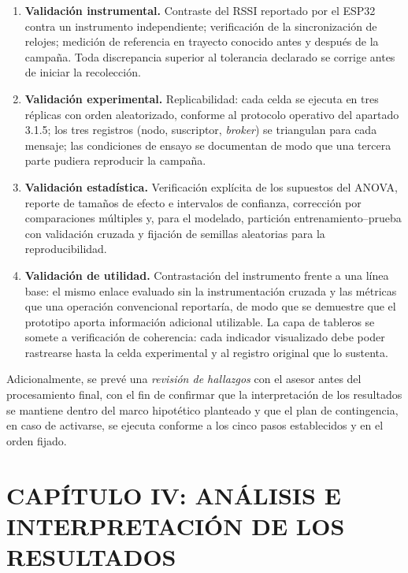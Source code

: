 \documentclass[
  12pt,
]{article}
\providecommand{\tightlist}{%
  \setlength{\itemsep}{0pt}\setlength{\parskip}{0pt}}
\begin{document}
\begin{enumerate}
\def\labelenumi{\arabic{enumi}.}
\tightlist
\item
  \textbf{Validación instrumental.} Contraste del RSSI reportado por el
  ESP32 contra un instrumento independiente; verificación de la
  sincronización de relojes; medición de referencia en trayecto conocido
  antes y después de la campaña. Toda discrepancia superior al
  tolerancia declarado se corrige antes de iniciar la recolección.
\item
  \textbf{Validación experimental.} Replicabilidad: cada celda se
  ejecuta en tres réplicas con orden aleatorizado, conforme al protocolo
  operativo del apartado 3.1.5; los tres registros (nodo, suscriptor,
  \emph{broker}) se triangulan para cada mensaje; las condiciones de
  ensayo se documentan de modo que una tercera parte pudiera reproducir
  la campaña.
\item
  \textbf{Validación estadística.} Verificación explícita de los
  supuestos del ANOVA, reporte de tamaños de efecto e intervalos de
  confianza, corrección por comparaciones múltiples y, para el modelado,
  partición entrenamiento–prueba con validación cruzada y fijación de
  semillas aleatorias para la reproducibilidad.
\item
  \textbf{Validación de utilidad.} Contrastación del instrumento frente
  a una línea base: el mismo enlace evaluado sin la instrumentación
  cruzada y las métricas que una operación convencional reportaría, de
  modo que se demuestre que el prototipo aporta información adicional
  utilizable. La capa de tableros se somete a verificación de
  coherencia: cada indicador visualizado debe poder rastrearse hasta la
  celda experimental y al registro original que lo sustenta.
\end{enumerate}

Adicionalmente, se prevé una \emph{revisión de hallazgos} con el asesor
antes del procesamiento final, con el fin de confirmar que la
interpretación de los resultados se mantiene dentro del marco hipotético
planteado y que el plan de contingencia, en caso de activarse, se
ejecuta conforme a los cinco pasos establecidos y en el orden fijado.

\section{CAPÍTULO IV: ANÁLISIS E INTERPRETACIÓN DE LOS
RESULTADOS}\label{capuxedtulo-iv-anuxe1lisis-e-interpretaciuxf3n-de-los-resultados}
\end{document}
